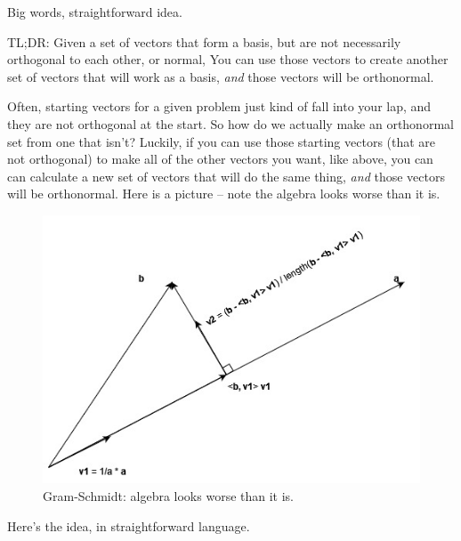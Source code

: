 \documentclass[
]{book}
\begin{document}
Big words, straightforward idea.

TL;DR: Given a set of vectors that form a basis, but are not necessarily orthogonal to each other, or normal, You can use those vectors to create another set of vectors that will work as a basis, \emph{and} those vectors will be orthonormal.

Often, starting vectors for a given problem just kind of fall into your lap, and they are not orthogonal at the start. So how do we actually make an orthonormal set from one that isn't? Luckily, if you can use those starting vectors (that are not orthogonal) to make all of the other vectors you want, like above, you can can calculate a new set of vectors that will do the same thing, \emph{and} those vectors will be orthonormal. Here is a picture -- note the algebra looks worse than it is.

\begin{figure}

{\centering \includegraphics[width=0.75\linewidth,height=0.75\textheight]{images/gram-schmidt} 

}

\caption{Gram-Schmidt: algebra looks worse than it is.}\label{fig:unnamed-chunk-16}
\end{figure}

Here's the idea, in straightforward language.
\end{document}
